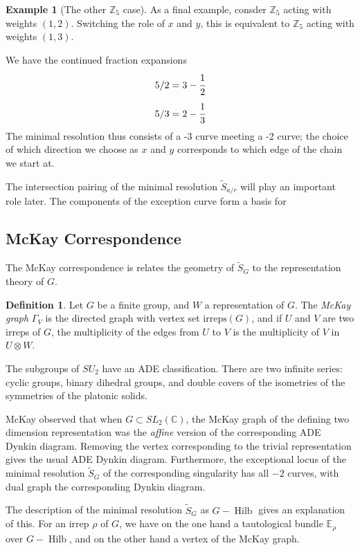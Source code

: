 \documentclass{amsart}[12pt]
\theoremstyle{definition}
\newtheorem{example}[dummy]{Example}
\newtheorem{definition}[dummy]{Definition}
\newcommand{\Z}{\mathbb{Z}}
\newcommand{\C}{\mathbb{C}}
\newcommand{\irreps}{\text{irreps}}
\DeclareMathOperator{\Hilb}{Hilb}
\begin{document}
\begin{example}[The other $\Z_5$ case]
As a final example, consder $\Z_5$ acting with weights $(1,2)$.  Switching the role of $x$ and $y$, this is equivalent to $\Z_5$ acting with weights $(1,3)$.

We have the continued fraction expansions
$$5/2=3-\cfrac{1}{2}$$
$$5/3=2-\cfrac{1}{3}$$
The minimal resolution thus consists of a -3 curve meeting a -2 curve; the choice of which direction we choose as $x$ and $y$ corresponds to which edge of the chain we start at.
\end{example}

The intersection pairing of the minimal resolution $\widetilde{S}_{a/r}$ will play an important role later.  The components of the exception curve form a basis for 


\subsection{McKay Correspondence}
The McKay correspondence is relates the geometry of $\widetilde{S}_G$ to the representation theory of $G$.

\begin{definition}
Let $G$ be a finite group, and $W$ a representation of $G$.  The \emph{McKay graph} $\Gamma_V$ is the directed graph with vertex set $\irreps(G)$, and if $U$ and $V$ are two irreps of $G$, the multiplicity of the edges from $U$ to $V$ is the multiplicity of $V$ in $U\otimes W$.
\end{definition}

The subgroups of $SU_2$ have an ADE classification.  There are two infinite series: cyclic groups, binary dihedral groups, and double covers of the isometries of the symmetries of the platonic solids.

McKay observed that when $G\subset SL_2(\C)$, the McKay graph of the defining two dimension representation was the \emph{affine} version of the corresponding ADE Dynkin diagram.  Removing the vertex corresponding to the trivial representation gives the usual ADE Dynkin diagram.  Furthermore, the exceptional locus of the minimal resolution $\widetilde{S}_G$ of the corresponding singularity has all $-2$ curves, with dual graph the corresponding Dynkin diagram. 

The description of the minimal resolution $\widetilde{S}_G$ as $G-\Hilb$ gives an explanation of this.  For an irrep $\rho$ of $G$, we have on the one hand a tautological bundle $\mathbb{E}_\rho$ over $G-\Hilb$, and on the other hand a vertex of the McKay graph.  
\end{document}

